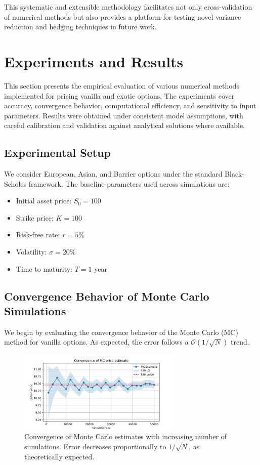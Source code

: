 \documentclass[12pt,a4paper]{article}
\begin{document}
This systematic and extensible methodology facilitates not only cross-validation of numerical methods but also provides a platform for testing novel variance reduction and hedging techniques in future work.

\section{Experiments and Results}

This section presents the empirical evaluation of various numerical methods implemented for pricing vanilla and exotic options. The experiments cover accuracy, convergence behavior, computational efficiency, and sensitivity to input parameters. Results were obtained under consistent model assumptions, with careful calibration and validation against analytical solutions where available.

\subsection{Experimental Setup}

We consider European, Asian, and Barrier options under the standard Black-Scholes framework. The baseline parameters used across simulations are:
\begin{itemize}
    \item Initial asset price: $S_0 = 100$
    \item Strike price: $K = 100$
    \item Risk-free rate: $r = 5\%$
    \item Volatility: $\sigma = 20\%$
    \item Time to maturity: $T = 1$ year
\end{itemize}

\subsection{Convergence Behavior of Monte Carlo Simulations}

We begin by evaluating the convergence behavior of the Monte Carlo (MC) method for vanilla options. As expected, the error follows a $\mathcal{O}(1/\sqrt{N})$ trend.

\begin{figure}[H]
    \centering
    \includegraphics[width=0.7\textwidth]{../plots/mc_convergence.png}
    \caption{Convergence of Monte Carlo estimates with increasing number of simulations. Error decreases proportionally to $1/\sqrt{N}$, as theoretically expected.}
\end{figure}
\end{document}
